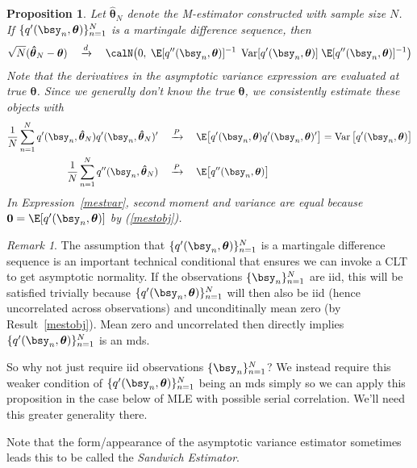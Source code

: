 \documentclass[12pt]{article}
\theoremstyle{plain}
\newtheorem{prop}[thm]{Proposition}
\theoremstyle{definition}
\theoremstyle{remark}
\newtheorem*{rmk}{Remark}
\newcommand{\bstheta}{\boldsymbol{\theta}}
\newcommand{\bshattheta}{\boldsymbol{\hat{\theta}}}
\renewcommand{\bso}{\boldsymbol{0}}
\newcommand{\Var}{\operatorname{Var}}
\newcommand{\pto}{\xrightarrow{P}}
\newcommand{\dto}{\xrightarrow{d}}
\newcommand{\sumnN}{\sum^N_{n=1}}
\newcommand{\nN}{_{n=1}^N}
\begin{document}
\begin{prop}
\label{prop:masymp}
Let $\bshattheta_N$ denote the M-estimator constructed with sample size
$N$.
If $\{q'(\bsy_n,\bstheta)\}\nN$ is a martingale difference sequence,
then
\begin{align*}
  \sqrt{N}(\bshattheta_N-\bstheta)
  \quad\dto\quad
  \calN\big(0,\;
  \E[q''(\bsy_n,\bstheta)]^{-1}
  \;
  \Var[q'(\bsy_n,\bstheta)]
  \;
  \E[q''(\bsy_n,\bstheta)]^{-1}
  \big)
\end{align*}
Note that the derivatives in the asymptotic variance expression are
evaluated at true $\bstheta$. Since we generally don't know the true
$\bstheta$, we consistently estimate these objects with
\begin{align}
  \frac{1}{N}\sumnN q'(\bsy_n,\bshattheta_N)q'(\bsy_n,\bshattheta_N)'
  \quad&\pto\quad
  \E\big[q'(\bsy_n,\bstheta)q'(\bsy_n,\bstheta)'\big]
  =
  \Var\big[q'(\bsy_n,\bstheta)\big]
  \label{mestvar}
  \\
  \frac{1}{N}\sumnN q''(\bsy_n,\bshattheta_N)
  \quad&\pto\quad
  \E\big[q''(\bsy_n,\bstheta)\big]
  \notag
\end{align}
In Expression~\ref{mestvar}, second moment and variance are equal
because $\bso=\E[q'(\bsy_n,\bstheta)]$ by (\ref{mestobj}).
\end{prop}
\begin{rmk}
The assumption that $\{q'(\bsy_n,\bstheta)\}\nN$ is a martingale
difference sequence is an important technical conditional that ensures
we can invoke a CLT to get asymptotic normality.
If the observations $\{\bsy_n\}\nN$ are iid, this will be satisfied
trivially because $\{q'(\bsy_n,\bstheta)\}\nN$ will then also be iid
(hence uncorrelated across observations) and unconditinally mean zero
(by Result~\ref{mestobj}).
Mean zero and uncorrelated then directly implies
$\{q'(\bsy_n,\bstheta)\}\nN$ is an mds.

So why not just require iid observations $\{\bsy_n\}\nN$?
We instead require this weaker condition of $\{q'(\bsy_n,\bstheta)\}\nN$
being an mds simply so we can apply this proposition in the case below
of MLE with possible serial correlation.
We'll need this greater generality there.

Note that the form/appearance of the asymptotic variance estimator
sometimes leads this to be called the \emph{Sandwich Estimator}.
\end{rmk}
\end{document}
